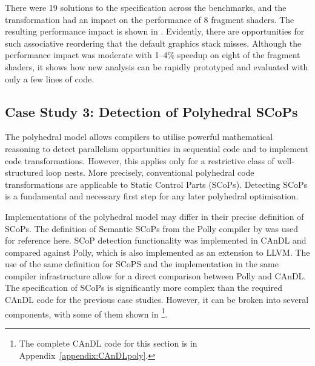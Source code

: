 
    There were 19 solutions to the specification across the benchmarks, and
    the transformation had an impact on the performance of 8 fragment shaders.
    The resulting performance impact is shown in .
    Evidently, there are opportunities for such associative reordering that
    the default graphics stack misses.
    Although the performance impact was moderate with 1--4\% speedup on eight
    of the fragment shaders, it shows how new analysis can be rapidly prototyped
    and evaluated with only a few lines of code.

\subsection{Case Study 3: Detection of Polyhedral SCoPs}

    The polyhedral model
    \citep{Karp:1967:OCU:321406.321418,benabderrahmane2010polyhedral} allows
    compilers to utilise powerful mathematical reasoning to detect parallelism
    opportunities in sequential code and to implement code transformations.
    However, this applies only for a restrictive class of well-structured loop
    nests.
    More precisely, conventional polyhedral code transformations are applicable
    to Static Control Parts (SCoPs).
    Detecting SCoPs is a fundamental and necessary first step for any later
    polyhedral optimisation.

    Implementations of the polyhedral model may differ in their precise
    definition of SCoPs.
    The definition of Semantic SCoPs from the Polly compiler by
    \citet{Lengauer2012Polly} was used for reference here.
    SCoP detection functionality was implemented in CAnDL and compared against
    Polly, which is also implemented as an extension to LLVM.
    The use of the same definition for SCoPS and the implementation in the same
    compiler infrastructure allow for a direct comparison between Polly and
    CAnDL.
    The specification of SCoPs is significantly more complex than the required
    CAnDL code for the previous case studies.
    However, it can be broken into several components, with some of them shown
    in 
    \footnote{The complete CAnDL code for this section is in
    Appendix~\ref{appendix:CAnDLpoly}.}.


